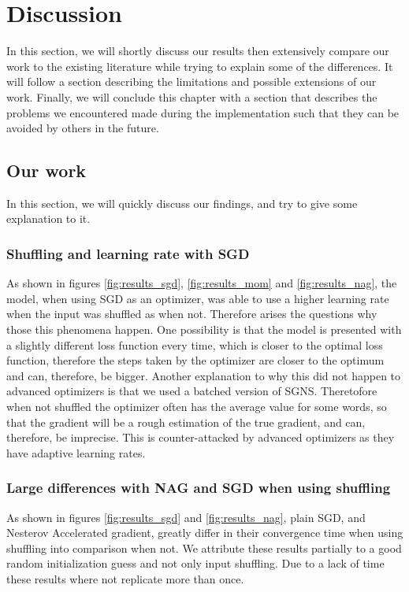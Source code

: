 \chapter{Discussion}\label{chap:discussion}



In this section, we will shortly discuss our results then extensively compare our work to the existing literature while trying to explain some of the differences. It will follow a section describing the limitations and possible extensions of our work. Finally, we will conclude this chapter with a section that describes the problems we encountered made during the implementation such that they can be avoided by others in the future.

\section{Our work}
In this section, we will quickly discuss our findings, and try to give some explanation to it.  
\subsection{Shuffling and learning rate with SGD}
As shown in figures \ref{fig:results_sgd}, \ref{fig:results_mom} and \ref{fig:results_nag}, the model, when using SGD as an optimizer,  was able to use a higher learning rate when the input was shuffled as when not. Therefore arises the questions why those this phenomena happen. One possibility is that the model is presented with a slightly different loss function every time, which is closer to the optimal loss function, therefore the steps taken by the optimizer are closer to the optimum and can, therefore, be bigger. Another explanation to why this did not happen to advanced optimizers is that we used a batched version of SGNS. Theretofore when not shuffled the optimizer often has the average value for some words, so that the gradient will be a rough estimation of the true gradient, and can, therefore, be imprecise. This is counter-attacked by advanced optimizers as they have adaptive learning rates.
\subsection{Large differences with NAG and SGD when using shuffling}
As shown in figures \ref{fig:results_sgd} and \ref{fig:results_nag}, plain SGD, and Nesterov Accelerated gradient, greatly differ in their convergence time when using shuffling into comparison when not. We attribute these results partially to a good random initialization guess and not only input shuffling. Due to a lack of time these results where not replicate more than once. 

